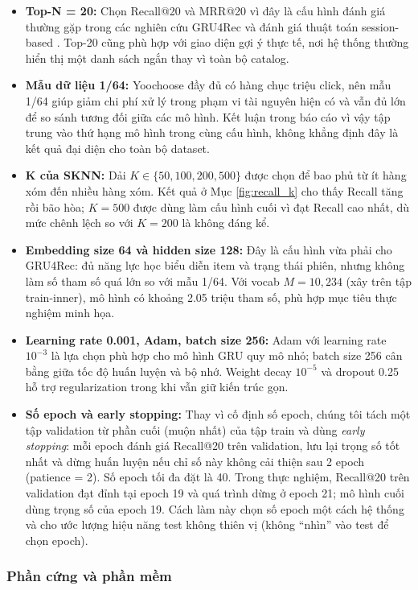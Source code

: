 \documentclass[12pt, a4paper]{article}
\begin{document}
\begin{itemize}
    \item \textbf{Top-N = 20:} Chọn Recall@20 và MRR@20 vì đây là cấu hình đánh giá thường gặp trong các nghiên cứu GRU4Rec và đánh giá thuật toán session-based \cite{hidasi2016,ludewig2018}. Top-20 cũng phù hợp với giao diện gợi ý thực tế, nơi hệ thống thường hiển thị một danh sách ngắn thay vì toàn bộ catalog.
    \item \textbf{Mẫu dữ liệu 1/64:} Yoochoose đầy đủ có hàng chục triệu click, nên mẫu 1/64 giúp giảm chi phí xử lý trong phạm vi tài nguyên hiện có và vẫn đủ lớn để so sánh tương đối giữa các mô hình. Kết luận trong báo cáo vì vậy tập trung vào thứ hạng mô hình trong cùng cấu hình, không khẳng định đây là kết quả đại diện cho toàn bộ dataset.
    \item \textbf{K của SKNN:} Dải $K \in \{50,100,200,500\}$ được chọn để bao phủ từ ít hàng xóm đến nhiều hàng xóm. Kết quả ở Mục \ref{fig:recall_k} cho thấy Recall tăng rồi bão hòa; $K=500$ được dùng làm cấu hình cuối vì đạt Recall cao nhất, dù mức chênh lệch so với $K=200$ là không đáng kể.
    \item \textbf{Embedding size 64 và hidden size 128:} Đây là cấu hình vừa phải cho GRU4Rec: đủ năng lực học biểu diễn item và trạng thái phiên, nhưng không làm số tham số quá lớn so với mẫu 1/64. Với vocab $M=10{,}234$ (xây trên tập train-inner), mô hình có khoảng 2.05 triệu tham số, phù hợp mục tiêu thực nghiệm minh họa.
    \item \textbf{Learning rate 0.001, Adam, batch size 256:} Adam với learning rate $10^{-3}$ là lựa chọn phù hợp cho mô hình GRU quy mô nhỏ; batch size 256 cân bằng giữa tốc độ huấn luyện và bộ nhớ. Weight decay $10^{-5}$ và dropout 0.25 hỗ trợ regularization trong khi vẫn giữ kiến trúc gọn.
    \item \textbf{Số epoch và early stopping:} Thay vì cố định số epoch, chúng tôi tách một tập validation từ phần cuối (muộn nhất) của tập train và dùng \emph{early stopping}: mỗi epoch đánh giá Recall@20 trên validation, lưu lại trọng số tốt nhất và dừng huấn luyện nếu chỉ số này không cải thiện sau 2 epoch (patience = 2). Số epoch tối đa đặt là 40. Trong thực nghiệm, Recall@20 trên validation đạt đỉnh tại epoch 19 và quá trình dừng ở epoch 21; mô hình cuối dùng trọng số của epoch 19. Cách làm này chọn số epoch một cách hệ thống và cho ước lượng hiệu năng test không thiên vị (không ``nhìn'' vào test để chọn epoch).
\end{itemize}

\subsubsection{Phần cứng và phần mềm}
\end{document}
